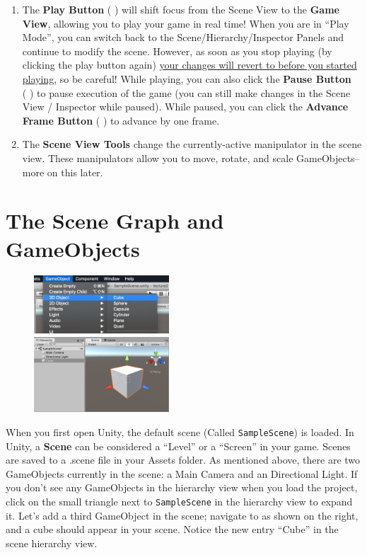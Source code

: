 \documentclass[11pt]{article}
\begin{document}
\begin{enumerate}
    \item The \textbf{Play Button} (\,\faPlay\,) will shift focus from the Scene View to the \textbf{Game View}, allowing you to play your game in real time!  When you are in ``Play Mode'', you can switch back to the Scene/Hierarchy/Inspector Panels and continue to modify the scene.  However, as soon as you stop playing (by clicking the play button again) \underline{your changes will revert to before you started playing}, so be careful!  While playing, you can also click the \textbf{Pause Button} (\,\faPause\,) to pause execution of the game (you can still make changes in the Scene View / Inspector while paused).  While paused, you can click the \textbf{Advance Frame Button} (\,\faFastForward\,) to advance by one frame.
    \item The \textbf{Scene View Tools} change the currently-active manipulator in the scene view.  These manipulators allow you to move, rotate, and scale GameObjects--more on this later.
\end{enumerate}

\section{The Scene Graph and GameObjects}

\begin{figure}
    \centering
    \includegraphics[width=0.45\textwidth]{cube-menu-item}\\
    \includegraphics[width=0.45\textwidth]{newcube}
\end{figure}

When you first open Unity, the default scene (Called \texttt{SampleScene}) is loaded.  In Unity, a \textbf{Scene} can be considered a ``Level'' or a ``Screen'' in your game.  Scenes are saved to a .scene file in your Assets folder.  As mentioned above, there are two GameObjects currently in the scene: a Main Camera and an Directional Light.  If you don't see any GameObjects in the hierarchy view when you load the project, click on the small triangle next to \texttt{SampleScene} in the hierarchy view to expand it.  Let's add a third GameObject in the scene; navigate to  as shown on the right, and a cube should appear in your scene.  Notice the new entry ``Cube'' in the scene hierarchy view.
\end{document}
